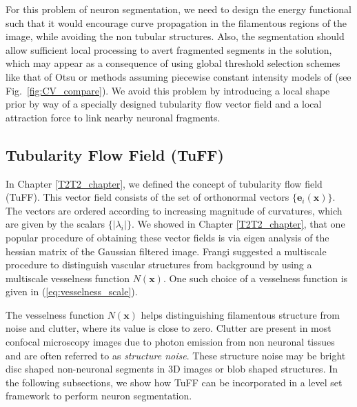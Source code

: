 For this problem of neuron segmentation, we need to design the energy functional such that it would encourage curve propagation in the filamentous regions of the image, while avoiding the non tubular structures. Also, the segmentation should allow sufficient local processing to avert fragmented segments in the solution, which may appear as a consequence of using global threshold selection schemes like that of Otsu \cite{otsu} or methods assuming piecewise constant intensity models of \cite{chan_vese} (see Fig.~\ref{fig:CV_compare}).  We avoid this problem  by introducing a local shape prior by way of a specially designed tubularity flow vector field and a local  attraction force  to link nearby neuronal fragments.

\subsection{Tubularity Flow Field (TuFF)}
In Chapter \ref{T2T2_chapter}, we defined the concept of tubularity flow field (TuFF). This vector field consists of the set of orthonormal vectors $\{\textbf{e}_i(\textbf{x})\}$. The vectors are ordered according to increasing magnitude of curvatures, which are given by the scalars $\{|\lambda_i|\}$. We showed in Chapter \ref{T2T2_chapter}, that one popular procedure of obtaining these vector fields is via eigen analysis of the  hessian matrix of the Gaussian  filtered image. Frangi\cite{frangi_vesselness} suggested a multiscale procedure to distinguish vascular structures from background by using a multiscale vesselness function $N(\textbf{x})$. One such choice of a vesselness function is given in (\ref{eq:vesselness_scale}). 

The vesselness function $N(\textbf{x})$ helps distinguishing filamentous structure from noise and clutter, where its value is close to zero.  Clutter are present in most confocal microscopy images due to photon emission from non neuronal tissues and are often referred to as \emph{structure noise}. These structure noise may be bright disc shaped non-neuronal segments in 3D images or blob shaped structures. In the following subsections, we show how TuFF can be incorporated in a level set framework to perform neuron segmentation.

